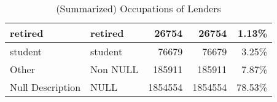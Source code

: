 \begin{table}[!htb]
\begin{tabular}{|l|l|r|r|r|}
retired                    & retired         & 26754   & 26754                   & 1.13\%                   \\ \hline
student                    & student         & 76679   & 76679                   & 3.25\%                   \\ \hline
Other                      & Non NULL        & 185911  & 185911                  & 7.87\%                   \\ \hline
Null Description           & NULL            & 1854554 & 1854554                 & 78.53\%                  \\ \hline
\end{tabular}
\caption{(Summarized) Occupations of Lenders } 
\label{tab:lenders_occupation}
\end{table}
